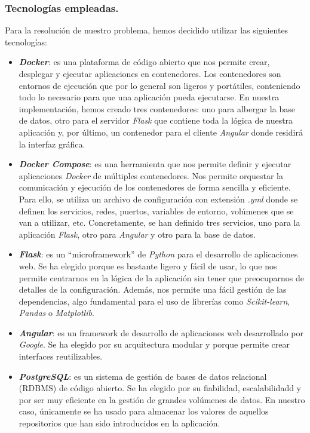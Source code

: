 \subsubsection{Tecnologías empleadas.}
Para la resolución de nuestro problema, hemos decidido utilizar las siguientes tecnologías:

\begin{itemize}
    \item \textbf{\textit{Docker}}: es una plataforma de código abierto que nos permite crear, desplegar
    y ejecutar aplicaciones en contenedores. Los contenedores son entornos de ejecución que por
    lo general son ligeros y portátiles, conteniendo todo lo necesario para que una aplicación
    pueda ejecutarse. En nuestra implementación, hemos creado tres contenedores: uno para albergar
    la base de datos, otro para el servidor \textit{Flask} que contiene toda la lógica de nuestra
    aplicación y, por último, un contenedor para el cliente \textit{Angular} donde residirá la
    interfaz gráfica.\\

    \item \textbf{\textit{Docker Compose}}: es una herramienta que nos permite definir y ejecutar
    aplicaciones \textit{Docker} de múltiples contenedores. Nos permite orquestar la comunicación
    y ejecución de los contenedores de forma sencilla y eficiente. Para ello, se utiliza un archivo
    de configuración con extensión \textit{.yml} donde se definen los servicios, redes, puertos,
    variables de entorno, volúmenes que se van a utilizar, etc. Concretamente, se han definido
    tres servicios, uno para la aplicación \textit{Flask}, otro para \textit{Angular} y otro para
    la base de datos.\\

    \item \textbf{\textit{Flask}}: es un ``microframework'' de \textit{Python} para el desarrollo
    de aplicaciones web. Se ha elegido porque es bastante ligero y fácil de usar, lo que nos
    permite centrarnos en la lógica de la aplicación sin tener que preocuparnos de detalles de la
    configuración. Además, nos permite una fácil gestión de las dependencias, algo fundamental
    para el uso de librerías como \textit{Scikit-learn}, \textit{Pandas} o \textit{Matplotlib}.\\

    \item \textbf{\textit{Angular}}: es un framework de desarrollo de aplicaciones web desarrollado
    por \textit{Google}. Se ha elegido por su arquitectura modular y porque permite crear
    interfaces reutilizables.\\

    \item \textbf{\textit{PostgreSQL}}: es un sistema de gestión de bases de datos relacional
    (RDBMS) de código abierto. Se ha elegido por su fiabilidad, escalabilidadd y por ser muy
    eficiente en la gestión de grandes volúmenes de datos. En nuestro caso, únicamente se ha
    usado para almacenar los valores de aquellos repositorios que han sido introducidos en la
    aplicación.\\
\end{itemize}


